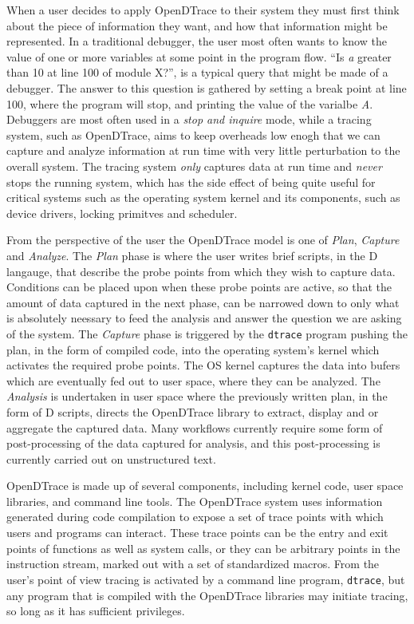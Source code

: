 When a user decides to apply OpenDTrace to their system they must
first think about the piece of information they want, and how that
information might be represented.  In a traditional debugger, the user
most often wants to know the value of one or more variables at some
point in the program flow.  ``Is \emph{a} greater than 10 at line 100
of module X?'', is a typical query that might be made of a debugger.
The answer to this question is gathered by setting a break point at
line 100, where the program will stop, and printing the value of the
varialbe \emph{A}.  Debuggers are most often used in a \emph{stop and
  inquire} mode, while a tracing system, such as OpenDTrace, aims to
keep overheads low enogh that we can capture and analyze information
at run time with very little perturbation to the overall system.  The
tracing system \emph{only} captures data at run time and \emph{never}
stops the running system, which has the side effect of being quite
useful for critical systems such as the operating system kernel and
its components, such as device drivers, locking primitves and
scheduler.

From the perspective of the user the OpenDTrace model is one of
\emph{Plan}, \emph{Capture} and \emph{Analyze}.  The \emph{Plan} phase
is where the user writes brief scripts, in the D langauge, that
describe the probe points from which they wish to capture data.
Conditions can be placed upon when these probe points are active, so
that the amount of data captured in the next phase, can be narrowed
down to only what is absolutely neessary to feed the analysis and
answer the question we are asking of the system.  The \emph{Capture}
phase is triggered by the \texttt{dtrace} program pushing the plan,
in the form of compiled code, into the operating system's kernel which
activates the required probe points.  The OS kernel captures the data
into bufers which are eventually fed out to user space, where they can
be analyzed.  The \emph{Analysis} is undertaken in user space where
the previously written plan, in the form of D scripts, directs the
OpenDTrace library to extract, display and or aggregate the captured
data.  Many workflows currently require some form of post-processing
of the data captured for analysis, and this post-processing is
currently carried out on unstructured text.

OpenDTrace is made up of several components, including kernel code,
user space libraries, and command line tools.  The OpenDTrace system
uses information generated during code compilation to expose a set of
trace points with which users and programs can interact.  These trace
points can be the entry and exit points of functions as well as system
calls, or they can be arbitrary points in the instruction stream,
marked out with a set of standardized macros.  From the user's point
of view tracing is activated by a command line program,
\texttt{dtrace}, but any program that is compiled with the OpenDTrace
libraries may initiate tracing, so long as it has sufficient
privileges.

